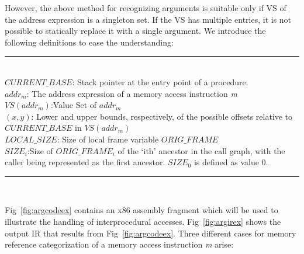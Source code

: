 However, the above method for recognizing arguments is suitable only if VS of the address expression is a singleton set. If the VS has multiple entries, it is not possible to statically replace it with a single argument. We introduce the following definitions to ease the understanding:
{\begin{scriptsize}
\vspace{-0.3ex}
\rule{\linewidth}{0.5pt}\\
{\scriptsize $CURRENT\_BASE$}: Stack pointer at the entry point of a procedure. \\
{\scriptsize $addr_m$}: The address expression of a memory access instruction \emph{m}\\
{\scriptsize $VS(addr_m)$}:Value Set of $addr_m$\\
{\scriptsize $(x,y)$}: Lower and upper bounds, respectively, of the possible offsets relative to {\scriptsize$CURRENT\_BASE$} in {\scriptsize $VS(addr_m)$}\\
{\scriptsize$LOCAL\_SIZE$}: Size of local frame variable {\scriptsize$ORIG\_FRAME$}\\
{\scriptsize$SIZE_{i}$}:Size of {\scriptsize$ORIG\_FRAME_{i}$} of the `ith' ancestor in the call graph, with the caller being represented as the first ancestor. {\scriptsize$SIZE_{0}$} is defined as value 0. \\
\rule{\linewidth}{0.5pt}\\
\vspace{-0.3ex}
\end{scriptsize}}
Fig~\ref{fig:argcodeex} contains an x86 assembly fragment which will be used to illustrate the handling of interprocedural accesses. Fig~\ref{fig:argirex} shows the output IR that results from Fig~\ref{fig:argcodeex}. Three different cases for memory reference categorization of a memory access instruction \emph{m} arise:

